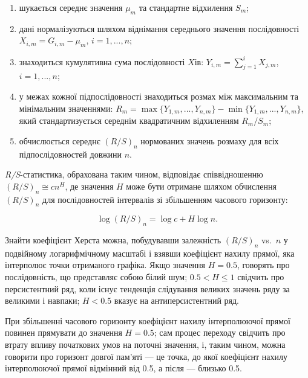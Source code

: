 \documentclass[
  letterpaper,
]{report}
\providecommand{\tightlist}{%
  \setlength{\itemsep}{0pt}\setlength{\parskip}{0pt}}\usepackage{longtable,booktabs,array}
\begin{document}
\begin{enumerate}
\def\labelenumi{\arabic{enumi}.}
\tightlist
\item
  шукається середнє значення \(\mu_m\) та стандартне відхилення \(S_m\);
\item
  дані нормалізуються шляхом віднімання середнього значення
  послідовності \(X_{i,m}=G_{i,m}-\mu_m\), \(i=1,...,n\);
\item
  знаходиться кумулятивна сума послідовності \(X\)ів:
  \(Y_{i,m}=\sum_{j=1}^{i}X_{j,m}\), \(i=1,...,n\);
\item
  у межах кожної підпослідовності знаходиться розмах між максимальним та
  мінімальним значеннями:
  \(R_m = \max\{Y_{1,m},...,Y_{n,m}\}-\min\{Y_{1,m},...,Y_{n,m}\}\),
  який стандартизується середнім квадратичним відхиленням
  \(R_{m}/S_{m}\);
\item
  обчислюється середнє \((R/S)_n\) нормованих значень розмаху для всіх
  підпослідовностей довжини \(n\).
\end{enumerate}

\emph{R/S}-статистика, обрахована таким чином, відповідає співвідношенню
\((R/S)_{n} \cong cn^{H}\), де значення \(H\) може бути отримане шляхом
обчислення \((R/S)_n\) для послідовностей інтервалів зі збільшенням
часового горизонту:

\[
\log{(R/S)}_{n} = \log{c} + H\log{n}. \tag{4}
\]

Знайти коефіцієнт Херста можна, побудувавши залежність \((R/S)_n\)
vs.~\(n\) у подвійному логарифмічному масштабі і взявши коефіцієнт
нахилу прямої, яка інтерполює точки отриманого графіка. Якщо значення
\(H=0.5\), говорять про послідовність, що представляє собою білий шум;
\(0.5 < H \leq 1\) свідчить про персистентний ряд, коли існує тенденція
слідування великих значень ряду за великими і навпаки; \(H<0.5\) вказує
на антиперсистентний ряд.

При збільшенні часового горизонту коефіцієнт нахилу інтерполюючої прямої
повинен прямувати до значення \(H=0.5\); сам процес переходу свідчить
про втрату впливу початкових умов на поточні значення, і, таким чином,
можна говорити про горизонт довгої пам'яті --- це точка, до якої
коефіцієнт нахилу інтерполюючої прямої відмінний від 0.5, а після ---
близько 0.5.
\end{document}
